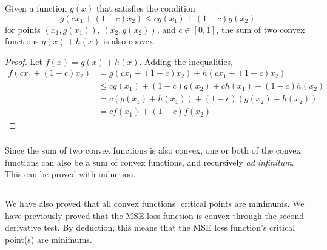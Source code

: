 \documentclass{article}
\begin{document}
\begin{theorem}
    Given a function \(g(x)\) that satisfies the condition
    \begin{equation}
        g(cx_1 + (1 - c) x_2) \leqslant cg(x_1) + (1 - c) g(x_2)
    \end{equation}
    for points \((x_1, g(x_1))\), \((x_2, g(x_2))\), and \(c \in [0, 1]\),
    the sum of two convex functions \(g(x) + h(x)\) is also convex.
\end{theorem}
\begin{proof}
    Let \(f(x) = g(x) + h(x)\).
    Adding the inequalities,
    \begin{align}
        f(cx_1 + (1 - c) x_2) &= g(cx_1 + (1 - c) x_2) + h(cx_1 + (1 - c) x_2) \\
        &\leqslant cg(x_1) + (1 - c) g(x_2) + ch(x_1) + (1 - c) h(x_2) \\
        &= c(g(x_1) + h(x_1)) + (1 - c) (g(x_2) + h(x_2)) \\
        &= cf(x_1) + (1 - c) f(x_2)
    \end{align}
\end{proof}

\subsubsection{}

Since the sum of two convex functions is also convex, one or both of the convex functions can also be a sum of convex functions, and recursively \emph{ad infinitum}.
This can be proved with induction.

\subsection{}

We have also proved that all convex functions' critical points are minimums.
We have previously proved that the MSE loss function is convex through the second derivative test.
By deduction, this means that the MSE loss function's critical point(s) are minimums.
\end{document}
